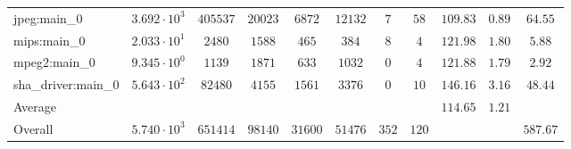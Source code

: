 \begin{tabular}{|l|c|c|c|c|c|c|c|c|c|c|}
jpeg:main\_0            & $ 3.692 \cdot 10^{3}  $ & $ 405537 $ & $ 20023 $ & $ 6872  $ & $ 12132 $ & $ 7   $ & $ 58  $ & $ 109.83      $ & $ 0.89    $ & $ 64.55   $ \\
mips:main\_0            & $ 2.033 \cdot 10^{1}  $ & $ 2480   $ & $ 1588  $ & $ 465   $ & $ 384   $ & $ 8   $ & $ 4   $ & $ 121.98      $ & $ 1.80    $ & $ 5.88    $ \\
mpeg2:main\_0           & $ 9.345 \cdot 10^{0}  $ & $ 1139   $ & $ 1871  $ & $ 633   $ & $ 1032  $ & $ 0   $ & $ 4   $ & $ 121.88      $ & $ 1.79    $ & $ 2.92    $ \\
sha\_driver:main\_0     & $ 5.643 \cdot 10^{2}  $ & $ 82480  $ & $ 4155  $ & $ 1561  $ & $ 3376  $ & $ 0   $ & $ 10  $ & $ 146.16      $ & $ 3.16    $ & $ 48.44   $ \\
\hline
Average                 & $                     $ & $        $ & $       $ & $       $ & $       $ & $     $ & $     $ & $ 114.65      $ & $ 1.21    $ & $         $ \\
\hline
Overall                 & $ 5.740 \cdot 10^{3}  $ & $ 651414 $ & $ 98140 $ & $ 31600 $ & $ 51476 $ & $ 352 $ & $ 120 $ & $             $ & $         $ & $ 587.67  $ \\
\hline
\end{tabular}
